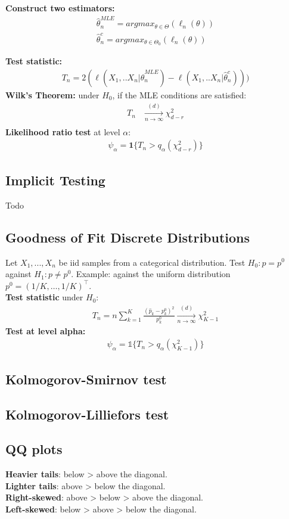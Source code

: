 \textbf{Construct two estimators:}
\begin{align*}
\widehat{\theta}_n^{MLE} = argmax_{\theta \in \Theta}(\ell_n(\theta))\\
\widehat{\theta}_n^c = argmax_{\theta \in \Theta_0}(\ell_n(\theta))
\end{align*}

\textbf{Test statistic:}
\begin{align*}
T_n = 2 ( \ell(X_1,..X_n|\widehat{\theta}_n^{MLE}) - \ell(X_1,..X_n|\widehat{\theta}_n^c)))
\end{align*}
\textbf{Wilk's Theorem:} under $H_0$, if the MLE conditions are satisfied: 
\begin{align*}
T_n& \xrightarrow[n \rightarrow \infty]{(d)} \chi_{d-r}^2\\
\end{align*}
\textbf{Likelihood ratio test} at level $\alpha$:
\begin{align*}
\psi_\alpha = \textbf{1}\{T_n > q_\alpha(\chi^2_{d-r})\}
\end{align*}
\subsection{Implicit Testing}
Todo
\subsection{Goodness of Fit Discrete Distributions}

Let $X_1,...,X_n$ be iid samples from a categorical distribution. Test $H_0: p = p^0$ against $H_1: p \neq p^0$. Example: against the uniform distribution $p^0 = (1/K, \ldots, 1/K)^\top$.\\

\textbf{Test statistic} under $H_0$:
\begin{align*}
T_n = n\sum_{k=1}^K\frac{(\hat{p}_k - p^0_k)^2}{p^0_k} \xrightarrow[n \rightarrow \infty]{(d)} \chi^2_{K-1}
\end{align*}
\textbf{Test at level alpha:}
\begin{align*}
\psi_\alpha = \mathbb{1}\{T_n > q_\alpha(\chi^2_{K-1})\}
\end{align*}
\subsection{Kolmogorov-Smirnov test}
\subsection{Kolmogorov-Lilliefors test}
\subsection{QQ plots}
\textbf{Heavier tails}: below > above the diagonal.\\
\textbf{Lighter tails}: above > below the diagonal.\\
\textbf{Right-skewed}: above > below > above the diagonal.\\
\textbf{Left-skewed}: below > above > below the diagonal.\\
